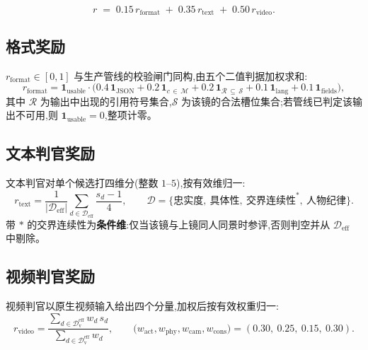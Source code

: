 \documentclass[UTF8, 11pt]{ctexart}
\begin{document}
\begin{equation}
r \;=\; 0.15\,r_{\text{format}} \;+\; 0.35\,r_{\text{text}} \;+\; 0.50\,r_{\text{video}} .
\label{eq:reward}
\end{equation}

\subsection{格式奖励}

$r_{\text{format}}\in[0,1]$ 与生产管线的校验闸门同构,由五个二值判据加权求和:
\begin{equation}
r_{\text{format}}
=\mathbf{1}_{\text{usable}}\cdot
\bigl(0.4\,\mathbf{1}_{\text{JSON}}
+0.2\,\mathbf{1}_{c\,\in\,\mathcal{M}}
+0.2\,\mathbf{1}_{\mathcal{R}\,\subseteq\,\mathcal{S}}
+0.1\,\mathbf{1}_{\text{lang}}
+0.1\,\mathbf{1}_{\text{fields}}\bigr),
\label{eq:rformat}
\end{equation}
其中 $\mathcal{R}$ 为输出中出现的引用符号集合,$\mathcal{S}$ 为该镜的合法槽位集合;若管线已判定该输出不可用,则 $\mathbf{1}_{\text{usable}}=0$,整项计零。

\subsection{文本判官奖励}

文本判官对单个候选打四维分(整数 $1$--$5$),按有效维归一:
\begin{equation}
r_{\text{text}}
=\frac{1}{\lvert \mathcal{D}_{\text{eff}}\rvert}
\sum_{d\in\mathcal{D}_{\text{eff}}}\frac{s_d-1}{4},
\qquad
\mathcal{D}=\{\text{忠实度},\ \text{具体性},\ \text{交界连续性}^{\ast},\ \text{人物纪律}\}.
\label{eq:rtext}
\end{equation}
带 $\ast$ 的交界连续性为\textbf{条件维}:仅当该镜与上镜同人同景时参评,否则判空并从 $\mathcal{D}_{\text{eff}}$ 中剔除。

\subsection{视频判官奖励}

视频判官以原生视频输入给出四个分量,加权后按有效权重归一:
\begin{equation}
r_{\text{video}}
=\frac{\displaystyle\sum_{d\in\mathcal{D}_{\text{v}}^{\text{eff}}} w_d\, s_d}
       {\displaystyle\sum_{d\in\mathcal{D}_{\text{v}}^{\text{eff}}} w_d},
\qquad
\bigl(w_{\text{act}},w_{\text{phy}},w_{\text{cam}},w_{\text{cons}}\bigr)
=(0.30,\ 0.25,\ 0.15,\ 0.30).
\label{eq:rvideo}
\end{equation}
\end{document}
